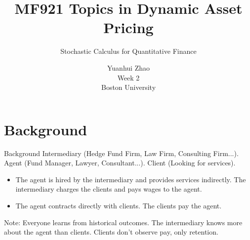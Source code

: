 \documentclass{beamer}
\title{MF921 Topics in Dynamic Asset Pricing}
\author{Stochastic Calculus for Quantitative Finance}
\date{Yuanhui Zhao\\Week 2\\Boston University}
\begin{document}
\frame{\titlepage}

\section{Background}
\begin{frame}{Background}
Intermediary (Hedge Fund Firm, Law Firm, Consulting Firm...).  
Agent (Fund Manager, Lawyer, Consultant...).  
Client (Looking for services).

\vspace{2em}
\begin{itemize}
    \item The agent is hired by the intermediary and provides services indirectly. The intermediary charges the clients and pays wages to the agent.
    \vspace{1em}
    \item The agent contracts directly with clients. The clients pay the agent.
\end{itemize}

\vspace{1em}
Note: Everyone learns from historical outcomes. The intermediary knows more about the agent than clients. Clients don’t observe pay, only retention.
\end{frame}

\end{document}
